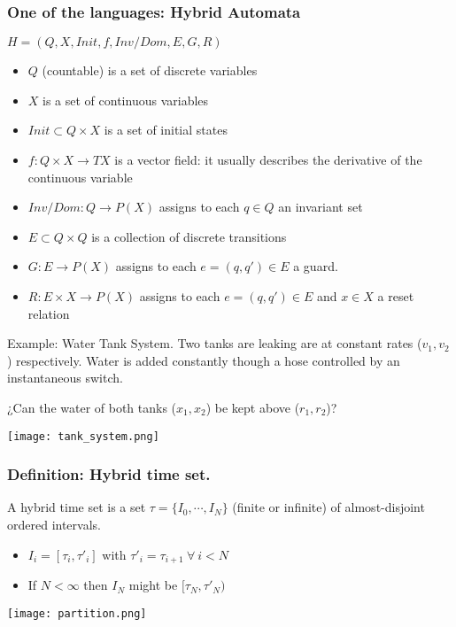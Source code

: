 \begin{frame}
	\frametitle{One of the languages: Hybrid Automata}
	$H = (Q, X, Init, f, Inv/Dom, E, G, R)$ %
	
	\begin{itemize}
		\item $Q$ (countable) is a set of discrete variables
		\item $X$ is a set of continuous variables
		\item $Init \subset Q \times X$ is a set of initial states
		\item $f: Q \times X \rightarrow TX$ is a vector field: it usually describes the derivative of the continuous variable
		\item $Inv/Dom: Q \rightarrow P(X)$ assigns to each $q \in Q$ an invariant set
		\item $E \subset Q \times Q$ is a collection of discrete transitions
		\item $G : E \rightarrow P(X)$ assigns to each $e=(q,q') \in E$ a guard.
		\item $R : E \times X \rightarrow P(X)$ assigns to each $e = (q,q') \in E$ and $x \in X$ a reset relation
	\end{itemize}
	
Example: Water Tank System. Two tanks are leaking are at constant rates ($v_1,v_2$) respectively. Water is added constantly though a hose controlled by an instantaneous switch.

¿Can the water of both tanks ($x_1,x_2$) be kept above ($r_1,r_2$)?
\end{frame}

\begin{frame}
\texttt{[image: tank\_system.png]}
\end{frame}

\begin{frame}
	\frametitle{Definition: Hybrid time set.}
	
	A hybrid time set is a set $\tau = \{I_0,\cdots,I_N\}$ (finite or infinite) of almost-disjoint ordered intervals.
	\begin{itemize}
		\item $I_i = [\tau_i, \tau'_i]$ with $\tau'_i = \tau_{i+1}\ \forall\ i < N$
		\item If $N < \infty$ then $I_N$ might be $[\tau_N, \tau'_N)$
	\end{itemize}	 
	\texttt{[image: partition.png]}
\end{frame}

